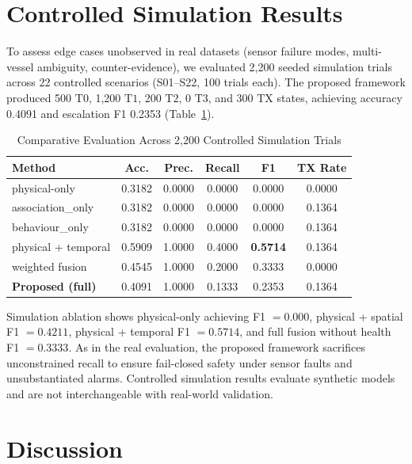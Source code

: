 \documentclass[conference]{IEEEtran}
\newcommand{\dstate}[1]{\ensuremath{\mathrm{#1}}}
\begin{document}
\section{Controlled Simulation Results}
\label{sec:sim}

To assess edge cases unobserved in real datasets (sensor failure modes, multi-vessel
ambiguity, counter-evidence), we evaluated 2,200 seeded simulation trials across
22 controlled scenarios (S01--S22, 100 trials each). The proposed framework
produced 500 \dstate{T0}, 1{,}200 \dstate{T1}, 200 \dstate{T2}, 0 \dstate{T3},
and 300 \dstate{TX} states, achieving accuracy 0.4091 and escalation F1 0.2353
(Table~\ref{tab:sim-baselines}).

\begin{table}[!t]
\caption{Comparative Evaluation Across 2,200 Controlled Simulation Trials}
\label{tab:sim-baselines}
\centering
\footnotesize
\setlength{\tabcolsep}{3pt}
\begin{tabular}{@{}lccccc@{}}
\toprule
Method & Acc. & Prec. & Recall & F1 & TX Rate \\
\midrule
physical-only & 0.3182 & 0.0000 & 0.0000 & 0.0000 & 0.0000 \\
association\_only & 0.3182 & 0.0000 & 0.0000 & 0.0000 & 0.1364 \\
behaviour\_only & 0.3182 & 0.0000 & 0.0000 & 0.0000 & 0.1364 \\
physical + temporal & 0.5909 & 1.0000 & 0.4000 & \textbf{0.5714} & 0.1364 \\
weighted fusion & 0.4545 & 1.0000 & 0.2000 & 0.3333 & 0.0000 \\
\textbf{Proposed (full)} & 0.4091 & 1.0000 & 0.1333 & 0.2353 & 0.1364 \\
\bottomrule
\end{tabular}
\end{table}

Simulation ablation shows physical-only achieving F1 $= 0.000$, physical + spatial
F1 $= 0.4211$, physical + temporal F1 $= 0.5714$, and full fusion without health
F1 $= 0.3333$. As in the real evaluation, the proposed framework sacrifices
unconstrained recall to ensure fail-closed safety under sensor faults and
unsubstantiated alarms. Controlled simulation results evaluate synthetic models
and are not interchangeable with real-world validation.

\section{Discussion}
\end{document}
